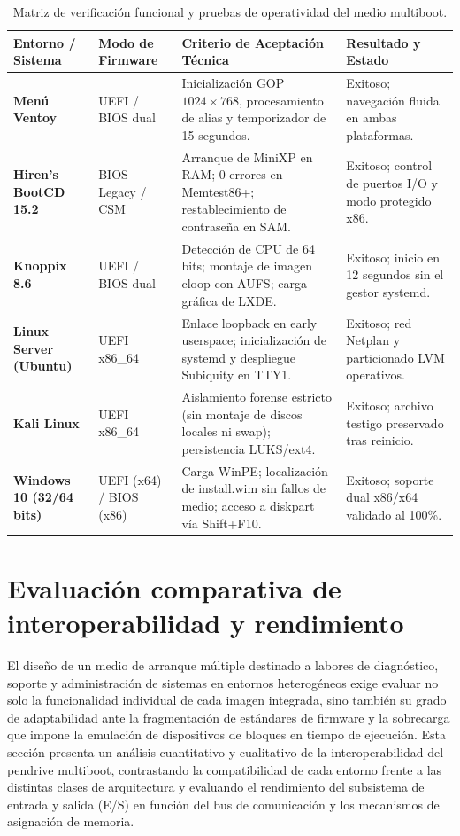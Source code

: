 \documentclass[12pt]{article}
\begin{document}
\begin{table}[htbp]
\centering
\small
\renewcommand{\arraystretch}{1.15}
\renewcommand{\tabularxcolumn}[1]{m{#1}}
\setlength{\emergencystretch}{1.5em}
\caption{Matriz de verificación funcional y pruebas de operatividad del medio multiboot.}
\label{tab:resumenPruebasOperatividad}
\begin{tabularx}{\textwidth}{>{\centering\arraybackslash}m{2.5cm} X X X}
\toprule
\textbf{Entorno / Sistema} & \textbf{Modo de Firmware} & \textbf{Criterio de Aceptación Técnica} & \textbf{Resultado y Estado} \\
\midrule
\textbf{Menú Ventoy} & UEFI / BIOS dual & Inicialización GOP $1024 \times 768$, procesamiento de alias y temporizador de 15 segundos. & Exitoso; navegación fluida en ambas plataformas. \\
\addlinespace
\textbf{Hiren's BootCD 15.2} & BIOS Legacy / CSM & Arranque de MiniXP en RAM; 0 errores en Memtest86+; restablecimiento de contraseña en SAM. & Exitoso; control de puertos I/O y modo protegido x86. \\
\addlinespace
\textbf{Knoppix 8.6} & UEFI / BIOS dual & Detección de CPU de 64 bits; montaje de imagen cloop con AUFS; carga gráfica de LXDE. & Exitoso; inicio en 12 segundos sin el gestor systemd. \\
\addlinespace
\textbf{Linux Server (Ubuntu)} & UEFI x86\_64 & Enlace loopback en early userspace; inicialización de systemd y despliegue Subiquity en TTY1. & Exitoso; red Netplan y particionado LVM operativos. \\
\addlinespace
\textbf{Kali Linux} & UEFI x86\_64 & Aislamiento forense estricto (sin montaje de discos locales ni swap); persistencia LUKS/ext4. & Exitoso; archivo testigo preservado tras reinicio. \\
\addlinespace
\textbf{Windows 10 (32/64 bits)} & UEFI (x64) / BIOS (x86) & Carga WinPE; localización de install.wim sin fallos de medio; acceso a diskpart vía Shift+F10. & Exitoso; soporte dual x86/x64 validado al 100\%. \\
\bottomrule
\end{tabularx}
\end{table}

\section{Evaluación comparativa de interoperabilidad y rendimiento}
\label{sec:evaluacionComparativa}

El diseño de un medio de arranque múltiple destinado a labores de diagnóstico, soporte y administración de sistemas en entornos heterogéneos exige evaluar no solo la funcionalidad individual de cada imagen integrada, sino también su grado de adaptabilidad ante la fragmentación de estándares de firmware y la sobrecarga que impone la emulación de dispositivos de bloques en tiempo de ejecución. Esta sección presenta un análisis cuantitativo y cualitativo de la interoperabilidad del pendrive multiboot, contrastando la compatibilidad de cada entorno frente a las distintas clases de arquitectura y evaluando el rendimiento del subsistema de entrada y salida (E/S) en función del bus de comunicación y los mecanismos de asignación de memoria.
\end{document}
